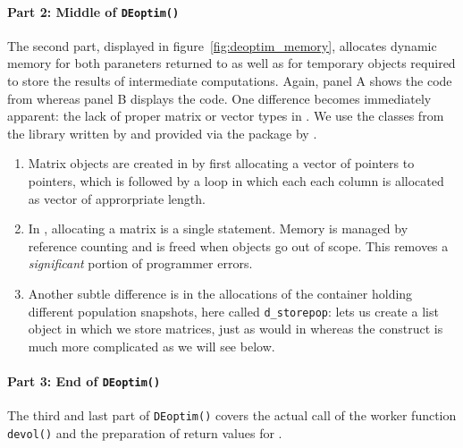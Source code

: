 \documentclass[nojss,shortnames,article]{jss}
\begin{document}
\paragraph{Part 2: Middle of \texttt{DEoptim()}} The second part,
displayed in figure~\ref{fig:deoptim_memory}, allocates dynamic memory for
both paraneters returned to  as well as for temporary objects
required to store the results of intermediate computations.  Again, panel A
shows the  code from  whereas panel B displays the
 code.  One difference becomes immediately apparent: the lack
of proper matrix or vector types in . We use the classes from the
  library written by
\cite{Sanderson:2010:Armadillo} and provided via the  package
 by \citet{CRAN:RcppArmadillo}.
\begin{enumerate}
\item Matrix objects are created in  by first allocating a vector
  of pointers to pointers, which is followed by a loop in which each each
  column is allocated as vector of approrpriate length.
\item In , allocating a matrix is a single statement. Memory is
  managed by reference counting and is freed when objects go out of
  scope. This removes a \textsl{significant} portion of programmer errors.
\item Another subtle difference is in the allocations of the container
  holding different population snapshots, here called \texttt{d\_storepop}:
   lets us create a list object in which we store matrices, just as
  would in  whereas the  construct is much more
  complicated as we will see below.
\end{enumerate}

\paragraph{Part 3: End of \texttt{DEoptim()}} The third and last part of
\verb|DEoptim()| covers the actual call of the worker function \verb|devol()|
and the preparation of return values for .
\end{document}

